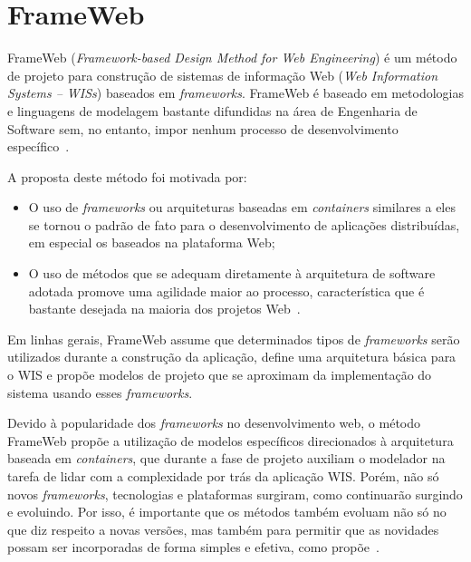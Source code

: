 
\section{FrameWeb}
\label{sec-referencial-frameweb}

FrameWeb (\textit{Framework-based Design Method for Web Engineering}) é um método de projeto para construção de sistemas de informação Web (\textit{Web Information Systems – WISs}) baseados em \textit{frameworks}. FrameWeb é baseado em metodologias e linguagens de modelagem bastante difundidas na área de Engenharia de Software sem, no entanto, impor nenhum processo de desenvolvimento específico~\cite{vitorFrameWeb}.

A proposta deste método foi motivada por:

\begin{itemize}
	\item O uso de \textit{frameworks} ou arquiteturas baseadas em \textit{containers} similares a eles se tornou o padrão de fato para o desenvolvimento de aplicações distribuídas, em especial os baseados na plataforma Web;
	
	\item O uso de métodos que se adequam diretamente à arquitetura de software adotada promove uma agilidade maior ao processo, característica que é bastante desejada na maioria dos projetos Web~\cite{presmannSoft}.
\end{itemize}

Em linhas gerais, FrameWeb assume que determinados tipos de \textit{frameworks} serão utilizados durante a construção da aplicação, define uma arquitetura básica para o WIS e propõe modelos de projeto que se aproximam da implementação do sistema usando esses \textit{frameworks}.

Devido à popularidade dos \textit{frameworks} no desenvolvimento web, o método FrameWeb propõe a utilização de modelos específicos direcionados à arquitetura baseada em \textit{containers}, que durante a fase de projeto auxiliam o modelador na tarefa de lidar com a complexidade por trás da aplicação WIS. Porém, não só novos \textit{frameworks}, tecnologias e plataformas surgiram, como continuarão surgindo e evoluindo. Por isso, é importante que os métodos também evoluam não só no que diz respeito a novas versões, mas também para permitir que as novidades possam ser incorporadas de forma simples e efetiva, como propõe~.

